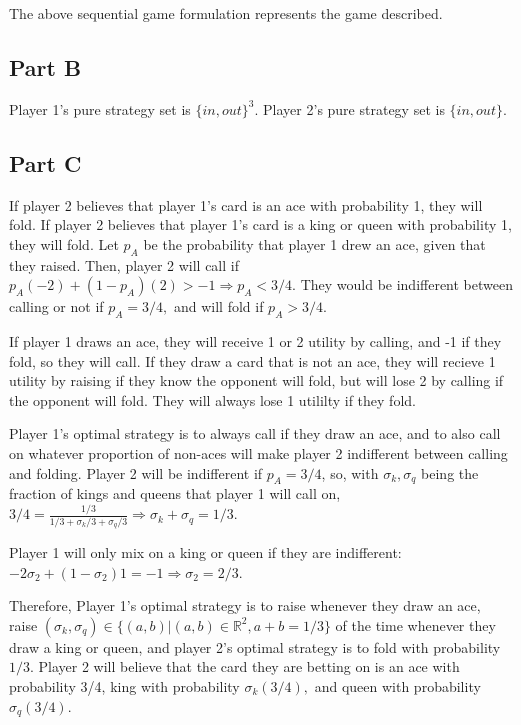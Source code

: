 \documentclass[11pt]{article} %
\begin{document}
The above sequential game formulation represents the game described. 
\subsection{Part B}
Player 1's pure strategy set is $\{in,out\}^3$. Player 2's pure strategy set is $\{in,out\}$.
\subsection{Part C}

If player 2 believes that player 1's card is an ace with probability 1, they will fold. If player 2 believes that player 1's card is a king or queen with probability 1, they  will fold. Let $p_A$ be the probability that player 1 drew an ace, given that they raised. Then, player 2 will call if $p_A(-2) + (1-p_A)(2)> -1\Rightarrow p_A< 3/4$. They would be indifferent between calling or not if $p_A = 3/4,$ and will fold if $p_A>3/4$. 

If player 1 draws an ace, they will receive 1 or 2 utility by calling, and -1 if they fold, so they will call. If they draw a card that is not an ace, they will recieve 1 utility by raising if they know the opponent will fold, but will lose 2 by calling if the opponent will fold. They will  always lose 1 utililty if they fold.

Player 1's optimal strategy is to always call if they draw an ace, and to also call on whatever proportion of non-aces will make player 2 indifferent between calling and folding. Player 2 will be indifferent if $p_A = 3/4$, so, with $\sigma_k,\sigma_q$ being the fraction of kings and queens that player 1 will call on, $3/4 = \frac{1/3}{1/3 + \sigma_k/3 +\sigma_q/3} \Rightarrow \sigma_k + \sigma_q = 1/3.$ 

Player 1 will only mix on a king or queen if they are indifferent: $-2\sigma_2 +(1-\sigma_2)1 = -1 \Rightarrow \sigma_2 = 2/3$. 

Therefore, Player 1's optimal strategy is to raise whenever they draw an ace, raise $(\sigma_k,\sigma_q) \in \{ (a,b)|(a,b) \in\mathbb{R}^2, a+b = 1/3 \} $ of the time whenever they draw a king or queen, and player 2's optimal strategy is to fold with probability $1/3$. Player 2 will believe that the card they are betting on is an ace with probability 3/4, king with probability $\sigma_k(3/4),$ and queen with probability $\sigma_q(3/4)$.
\end{document}

